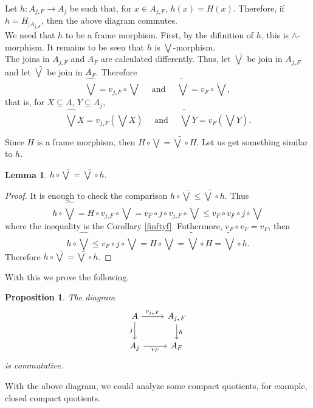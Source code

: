 \documentclass[11pt]{amsart}
\theoremstyle{plain}
\newtheorem{lem}[thm]{Lemma}
\newtheorem{prop}[thm]{Proposition}
\theoremstyle{definition}
\begin{document}
Let $h\colon A_{j_*F}\to A_j$ be such that, for $x\in A_{j_*F}$, $h(x)=H(x)$. Therefore, if $h=H_{\mid{A_{j_*F}}}$, then the above diagram commutes.\\

We need that $h$ to be a frame morphism. First, by the difinition of $h$, this is $\wedge$-morphism. It remains to be seen that $h$ is $\bigvee$-morphism.\\

The joins in $A_{j_*F}$ and $A_F$ are calculated differently. Thus, let $\hat{\bigvee}$ be join in $A_{j_*F}$ and let $\tilde{\bigvee}$ be join in $A_F$. Therefore
\[
\hat{\bigvee}=v_{j_*F}\circ \bigvee\quad\mbox{ and }\quad \tilde{\bigvee}=v_{F}\circ \bigvee,
\] 
that is, for $X\subseteq A$, $Y\subseteq A_j$,
\[
	\hat{\bigvee}X=v_{j_*F}(\bigvee X)\quad\mbox{ and }\quad \tilde{\bigvee}Y=v_{F}(\bigvee Y).
\]

Since $H$ is a frame morphism, then $H\circ \bigvee=\tilde{\bigvee}\circ H$. Let us get something similar to $h$.

\begin{lem}\label{bigvee g}
$h\circ \hat{\bigvee}=\tilde{\bigvee}\circ h$.
\end{lem}

\begin{proof}
It is enough to check the comparison $h\circ \hat{\bigvee}\leq \tilde{\bigvee}\circ h$. Thus
\[
h\circ \hat{\bigvee}=H\circ v_{j_*F}\circ \bigvee=v_F\circ j\circ v_{j_*F}\circ \bigvee\leq v_F\circ v_F\circ j\circ \bigvee
\]
where the inequality is the Corollary \ref{finftyf}. Futhermore, $v_F\circ v_F=v_F$, then
\[
h\circ\hat{\bigvee}\leq v_F\circ j\circ \bigvee =H\circ \bigvee=\tilde{\bigvee}\circ H=\tilde{\bigvee}\circ h.
\]
Therefore $h\circ\hat{\bigvee}=\tilde{\bigvee}\circ h$.
\end{proof}

With this we prove the following.

\begin{prop}\label{VFsquare}
The diagram
\[\begin{tikzcd}
	A & {A_{j_*F}} \\
	{A_j} & {A_F}
	\arrow["{v_{j_*F}}", from=1-1, to=1-2]
	\arrow["j"', from=1-1, to=2-1]
	\arrow["h", from=1-2, to=2-2]
	\arrow["{v_F}"', from=2-1, to=2-2]
\end{tikzcd}\]
is commutative.
\end{prop}

With the above diagram, we could analyze some compact quotients, for example, closed compact quotients.
\end{document}
